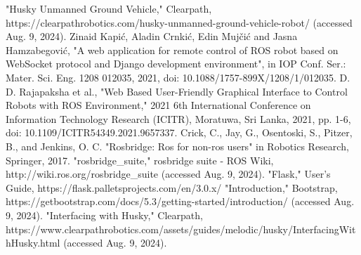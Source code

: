 \documentclass[letterpaper, 10 pt, conference]{ieeeconf}  %
\begin{document}
\begin{thebibliography}{99}
"Husky Unmanned Ground Vehicle," Clearpath, https://clearpathrobotics.com/husky-unmanned-ground-vehicle-robot/ (accessed Aug. 9, 2024).
 Zinaid Kapić, Aladin Crnkić, Edin Mujčić and Jasna Hamzabegović, "A web application for remote control of ROS robot based on WebSocket protocol and Django development environment", in IOP Conf. Ser.: Mater. Sci. Eng. 1208 012035, 2021, doi: 10.1088/1757-899X/1208/1/012035.
 D. D. Rajapaksha et al., "Web Based User-Friendly Graphical Interface to Control Robots with ROS Environment," 2021 6th International Conference on Information Technology Research (ICITR), Moratuwa, Sri Lanka, 2021, pp. 1-6, doi: 10.1109/ICITR54349.2021.9657337.
 Crick, C., Jay, G., Osentoski, S., Pitzer, B., and Jenkins, O. C. "Rosbridge: Ros for non-ros users" in Robotics Research, Springer, 2017.
"rosbridge\_suite," rosbridge suite - ROS Wiki, http://wiki.ros.org/rosbridge\_suite (accessed Aug. 9, 2024).
"Flask," User’s Guide, https://flask.palletsprojects.com/en/3.0.x/
"Introduction," Bootstrap, https://getbootstrap.com/docs/5.3/getting-started/introduction/ (accessed Aug. 9, 2024).
"Interfacing with Husky," Clearpath, https://www.clearpathrobotics.com/assets/guides/melodic/husky/InterfacingWithHusky.html (accessed Aug. 9, 2024).






\end{thebibliography}
\end{document}
